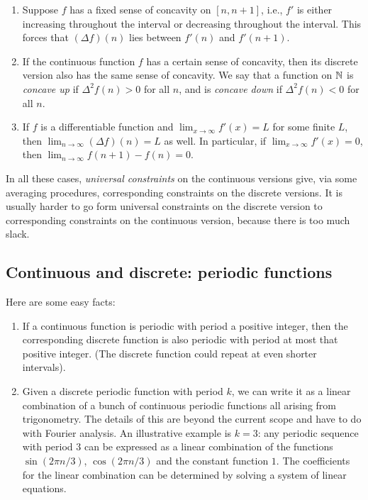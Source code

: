 \documentclass[10pt]{amsart}
\begin{document}
\begin{enumerate}
\item Suppose $f$ has a fixed sense of concavity on $[n,n+1]$, i.e., $f'$
  is either increasing throughout the interval or decreasing throughout
  the interval. This forces that $(\Delta f)(n)$ lies between $f'(n)$
  and $f'(n + 1)$.
\item If the continuous function $f$ has a certain sense of concavity,
  then its discrete version also has the same sense of concavity. We
  say that a function on $\mathbb{N}$ is {\em concave up} if $\Delta^2 f(n) >
  0$ for all $n$, and is {\em concave down} if $\Delta^2 f(n) < 0$ for
  all $n$.
\item If $f$ is a differentiable function and $\lim_{x \to \infty}
  f'(x) = L$ for some finite $L$, then $\lim_{n \to \infty} (\Delta
  f)(n) = L$ as well. In particular, if $\lim_{x \to \infty} f'(x) = 0$,
  then $\lim_{n \to \infty} f(n + 1) - f(n) = 0$.
\end{enumerate}

In all these cases, {\em universal constraints} on the continuous
versions give, via some averaging procedures, corresponding
constraints on the discrete versions. It is usually harder to go form
universal constraints on the discrete version to corresponding
constraints on the continuous version, because there is too much
slack.

\subsection{Continuous and discrete: periodic functions}

Here are some easy facts:

\begin{enumerate}
\item If a continuous function is periodic with period a positive
  integer, then the corresponding discrete function is also periodic
  with period at most that positive integer. (The discrete function
  could repeat at even shorter intervals).
\item Given a discrete periodic function with period $k$, we can write
  it as a linear combination of a bunch of continuous periodic
  functions all arising from trigonometry. The details of this are
  beyond the current scope and have to do with Fourier analysis. An
  illustrative example is $k = 3$: any periodic sequence with period
  $3$ can be expressed as a linear combination of the functions
  $\sin(2 \pi n/3)$, $\cos(2\pi n/3)$ and the constant function
  $1$. The coefficients for the linear combination can be determined
  by solving a system of linear equations.
\end{enumerate}
\end{document}
